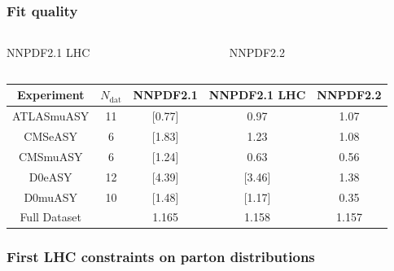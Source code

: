 \documentclass[10pt]{beamer}
\begin{document}
\begin{frame}
\frametitle{Fit quality}
\begin{columns}
  \begin{column}{0.5\textwidth}
    \centering
NNPDF2.1 LHC
 \begin{figure}[h!]
  \centering
\end{figure}
     \end{column}
       \begin{column}{0.5\textwidth}
           \centering
NNPDF2.2
 \begin{figure}[h!]
  \centering
\end{figure}
          \end{column}

\end{columns}

\begin{table}
  \begin{center}
    \begin{tabular}{|c|c|c|c|c|}
      \hline 
      Experiment & $N_{\mathrm{dat}} $ & NNPDF2.1 & NNPDF2.1 LHC & NNPDF2.2 \\
      \hline
      \hline
      \hline
      ATLASmuASY &   11 & [0.77]  &  0.97    &  1.07  \\
      \hline
      CMSeASY    &   6 &  [1.83]  &  1.23    &  1.08  \\
      \hline
      CMSmuASY   &   6 &  [1.24]  &  0.63    &  0.56  \\
      \hline
      D0eASY     &   12 & [4.39]  &  [3.46]  &  1.38  \\
      \hline
      D0muASY    &   10 & [1.48]  &  [1.17]  &  0.35  \\
      \hline
      \hline
      Full Dataset     &      &  1.165 &  1.158 &  1.157 \\
      \hline
    \end{tabular}
\end{center}
\end{table}

\end{frame}


\begin{frame}
\frametitle{First LHC constraints on parton distributions}
\begin{figure}[h!]
  \centering
\end{figure}
\end{frame}
 
\end{document}
